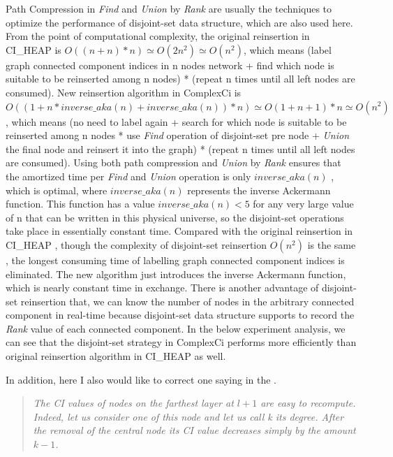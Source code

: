 \documentclass{article}
\newenvironment{itquote}
{\begin{quote}\itshape}
	{\end{quote}\ignorespacesafterend}
\begin{document}
\begin{enumerate}
\begin{item}
		Path Compression in \textit{Find} and \textit{Union} by \textit{Rank} are usually the techniques to optimize the performance of disjoint-set data structure\cite{wikiDisjointsetdatastructure}, which are also used here. 
		From the point of computational complexity, the original reinsertion in CI\_HEAP is $O((n+n)*n) \simeq O(2n^2) \simeq O(n^2)$, which means (label graph connected component indices in n nodes network + find which node is suitable to be reinserted among n nodes) * (repeat n times until all left nodes are consumed). New reinsertion algorithm in ComplexCi is $O((1+n*inverse\_aka(n)+inverse\_aka(n)) *n) \simeq O(1+n+1)*n \simeq O(n^2)$ , which means (no need to label again + search for which node is suitable to be reinserted among n nodes * use \textit{Find} operation of disjoint-set pre node + \textit{Union} the final node and reinsert it into the graph) * (repeat n times until all left nodes are consumed). Using both path compression and \textit{Union} by \textit{Rank} ensures that the amortized time per \textit{Find} and \textit{Union} operation is only $inverse\_aka(n)$ \cite{tarjan1979class}\cite{tarjan1984worst} , which is optimal, where $inverse\_aka(n)$ represents the inverse Ackermann function. This function has a value $inverse\_aka(n)<5$ for any very large value of n that can be written in this physical universe, so the disjoint-set operations take place in essentially constant time\cite{wikiDisjointsetdatastructure}. Compared with the original reinsertion in CI\_HEAP , though the complexity of disjoint-set reinsertion $O(n^2)$ is the same , the longest consuming time of labelling graph connected component indices is eliminated. The new algorithm just introduces the inverse Ackermann function, which is nearly constant time in exchange. There is another advantage of disjoint-set reinsertion that, we can know the number of nodes in the arbitrary connected component in real-time because disjoint-set data structure supports to record the \textit{Rank} value of each connected component. In the below experiment analysis, we can see that the disjoint-set strategy in ComplexCi performs more efficiently than original reinsertion algorithm in CI\_HEAP as well.


	\end{item}
	\end{enumerate}	

	
	In addition, here I also would like to correct one saying in the \cite{morone2016collective}. 
	
	\begin{itquote}
		The CI values of nodes on the farthest layer at $l + 1$ are easy to recompute. Indeed, let us consider one of this node and let us call k its degree. After the removal of the central node its CI value decreases simply by the amount $k − 1$.
	\end{itquote}
\end{document}
